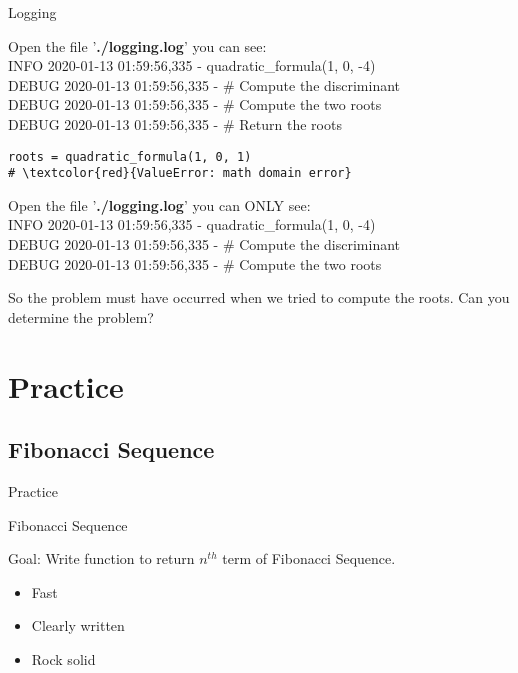 \documentclass{beamer}
\begin{document}
\begin{frame}[fragile]{Logging} \vspace{1em}
\small{
Open the file '\textbf{./logging.log}' you can see:\\
INFO 2020-01-13 01:59:56,335 - quadratic\_formula(1, 0, -4)\\
DEBUG 2020-01-13 01:59:56,335 - \# Compute the discriminant\\
DEBUG 2020-01-13 01:59:56,335 - \# Compute the two roots\\
DEBUG 2020-01-13 01:59:56,335 - \# Return the roots\par}
\begin{verbatim}
roots = quadratic_formula(1, 0, 1)
# \textcolor{red}{ValueError: math domain error}
\end{verbatim}
\small{
Open the file '\textbf{./logging.log}' you can ONLY see:\\
INFO 2020-01-13 01:59:56,335 - quadratic\_formula(1, 0, -4)\\
DEBUG 2020-01-13 01:59:56,335 - \# Compute the discriminant\\
DEBUG 2020-01-13 01:59:56,335 - \# Compute the two roots\par}
\vspace{10pt}
\large{
So the problem must have occurred when we tried to compute the
roots. Can you determine the problem?}
\end{frame}

\section{Practice}
\subsection{Fibonacci Sequence}

\begin{frame}[fragile]{Practice}
\begin{center}
{\LARGE Fibonacci Sequence\par} \vspace{1em}
Goal: Write function to return $n^{th}$ term of Fibonacci Sequence.
\begin{itemize}
\item Fast
\item Clearly written
\item Rock solid
\end{itemize}
\end{center}
\end{frame}
\end{document}
